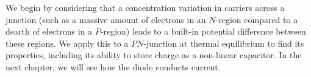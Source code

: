 We begin by considering that a concentration variation in carriers across a junction (such as a massive amount of electrons in an $N$-region compared to a dearth of electrons in a $P$-region) leads to a built-in potential difference between these regions.  We apply this to a $PN$-junction at thermal equilibrium to find its properties, including its ability to store charge as a non-linear capacitor.  In the next chapter, we will see how the diode conducts current.
\newpage

